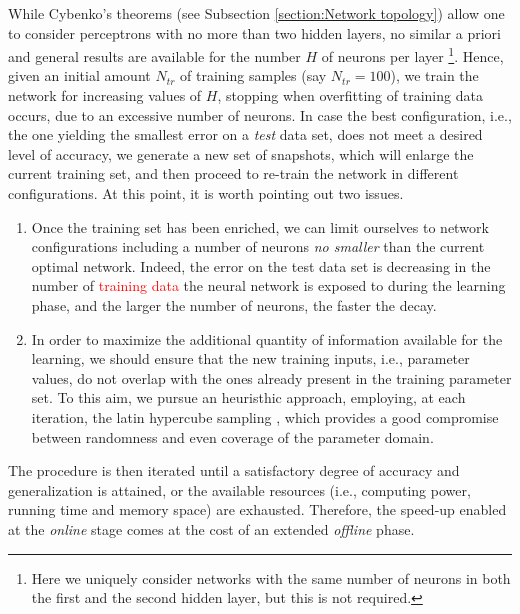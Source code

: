 \documentclass[longtitle]{elsarticle}
\numberwithin{equation}{section}
\theoremstyle{theorem}
\theoremstyle{definition}
\theoremstyle{remark}
\theoremstyle{proposition}
\numberwithin{figure}{section}
\begin{document}
		While Cybenko's theorems (see Subsection \ref{section:Network topology}) allow one to consider perceptrons with no more than two hidden layers, no similar a priori and general results are available for the number $H$ of neurons per layer \footnote{ Here we uniquely consider networks with the same number of neurons in both the first and the second hidden layer, but this is not required.}. Hence, given an initial amount $N_{tr}$ of training samples (say $N_{tr} = 100$), we train the network for increasing values of $H$, stopping when overfitting of training data occurs, due to an excessive number of neurons. In case the best configuration, i.e., the one yielding the smallest error on a \emph{test} data set, does not meet a desired level of accuracy, we generate a new set of snapshots, which will enlarge the current training set, and then proceed to re-train the network in different configurations. At this point, it is worth pointing out two issues. 
		\begin{enumerate}[label=(\roman*)]
			\vspace*{-0.1cm}
			\item Once the training set has been enriched, we can limit ourselves to network configurations including a number of neurons \emph{no smaller} than the current optimal network. Indeed, the error on the test data set is decreasing in the number of \textcolor{red}{training data} the neural network is exposed to during the learning phase, and the larger the number of neurons, the faster the decay.
			\item In order to maximize the additional quantity of information available for the learning, we should ensure that the new training inputs, i.e., parameter values, do not overlap with the ones already present in the training parameter set. To this aim, we pursue an heuristhic approach, employing, at each iteration, the latin hypercube sampling \cite{Imam08}, which provides a good compromise between randomness and even coverage of the parameter domain. 	
		\end{enumerate} 
		\vspace*{-0.1cm}
		The procedure is then iterated until a satisfactory degree of accuracy and generalization is attained, or the available resources (i.e., computing power, running time and memory space) are exhausted. Therefore, the speed-up enabled at the \emph{online} stage comes at the cost of an extended \emph{offline} phase. 
		
\end{document}
